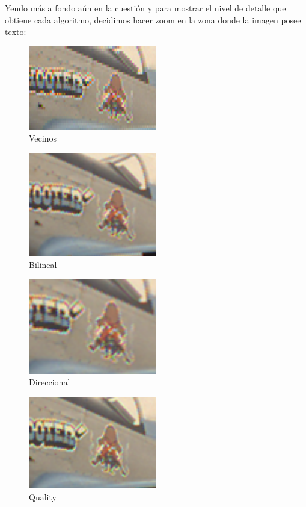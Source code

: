 {Yendo más a fondo aún en la cuestión y para mostrar el nivel de detalle que obtiene cada algoritmo, decidimos hacer zoom en la zona donde la imagen posee texto:

\begin{figure}
       \includegraphics[width=0.5\textwidth]{imagenes/img9_demosicing_vecino_cropped.png}
        \caption{Vecinos}
\end{figure}

\begin{figure}
       \includegraphics[width=0.5\textwidth]{imagenes/img9_demosicing_bilineal_cropped.png}
        \caption{Bilineal}
\end{figure}

\begin{figure}
       \includegraphics[width=0.5\textwidth]{imagenes/img9_demosicing_spline_cropped.png}
        \caption{Direccional}
\end{figure}

\begin{figure}
       \includegraphics[width=0.5\textwidth]{imagenes/img9_demosicing_quality_cropped.png}
        \caption{Quality}
\end{figure}

}
